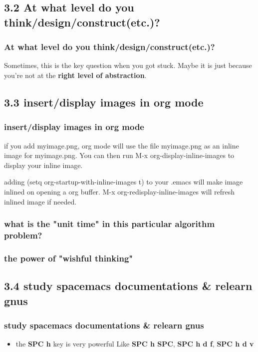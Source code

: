 \documentclass[11pt]{article}
\begin{document}
\subsection*{3.2 At what \textbf{level} do you think/design/construct(etc.)?}
\label{sec:orgheadline130}
\subsubsection*{At what \textbf{level} do you think/design/construct(etc.)?}
\label{sec:orgheadline129}
Sometimes, this is the key question when you got stuck.
Maybe it is just because you're not at the \textbf{right level of abstraction}.
\subsection*{3.3 insert/display images in org mode}
\label{sec:orgheadline134}
\subsubsection*{insert/display images in org mode}
\label{sec:orgheadline131}
if you add myimage.png, org mode will use the file myimage.png as an inline
image for myimage.png. You can then run M-x org-display-inline-images to display
your inline image.

adding (setq org-startup-with-inline-images t) to your .emacs will make image
inlined on opening a org buffer. M-x org-redisplay-inline-images will refresh
inlined image if needed.
\subsubsection*{what is the "unit time" in this particular algorithm problem?}
\label{sec:orgheadline132}
\subsubsection*{the power of "wishful thinking"}
\label{sec:orgheadline133}
\subsection*{3.4 study spacemacs documentations \& relearn \textbf{gnus}}
\label{sec:orgheadline137}
\subsubsection*{study spacemacs documentations \& relearn \textbf{gnus}}
\label{sec:orgheadline136}
\begin{itemize}
\item the \textbf{SPC h} key is very powerful
\label{sec:orgheadline135}
Like \textbf{SPC h SPC}, \textbf{SPC h d f}, \textbf{SPC h d v}
\end{itemize}
\end{document}
